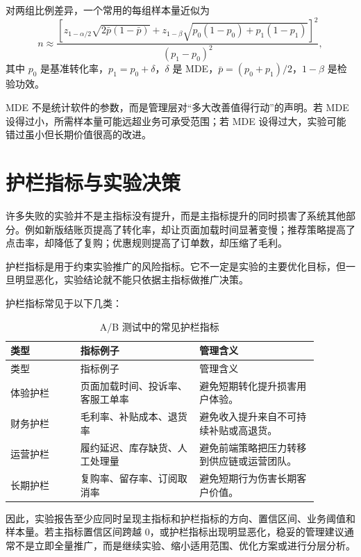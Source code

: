 \documentclass[UTF8,fontset=fandol,openany,zihao=-4]{ctexbook}
\begin{document}
对两组比例差异，一个常用的每组样本量近似为
\[
n
\approx
\frac{
\left[
z_{1-\alpha/2}\sqrt{2\bar p(1-\bar p)}
+
z_{1-\beta}\sqrt{p_0(1-p_0)+p_1(1-p_1)}
\right]^2
}{
(p_1-p_0)^2
},
\]
其中 \(p_0\) 是基准转化率，\(p_1=p_0+\delta\)，\(\delta\) 是 MDE，\(\bar p=(p_0+p_1)/2\)，\(1-\beta\) 是检验功效。

\begin{modernbox}[管理解释]
MDE 不是统计软件的参数，而是管理层对“多大改善值得行动”的声明。若 MDE 设得过小，所需样本量可能远超业务可承受范围；若 MDE 设得过大，实验可能错过虽小但长期价值很高的改进。
\end{modernbox}

\section{护栏指标与实验决策}

许多失败的实验并不是主指标没有提升，而是主指标提升的同时损害了系统其他部分。例如新版结账页提高了转化率，却让页面加载时间显著变慢；推荐策略提高了点击率，却降低了复购；优惠规则提高了订单数，却压缩了毛利。

\begin{definition}[护栏指标]
护栏指标是用于约束实验推广的风险指标。它不一定是实验的主要优化目标，但一旦明显恶化，实验结论就不能只依据主指标做推广决策。
\end{definition}

护栏指标常见于以下几类：
\begin{longtable}{>{\raggedright\arraybackslash}p{0.20\linewidth}>{\raggedright\arraybackslash}p{0.34\linewidth}>{\raggedright\arraybackslash}p{0.34\linewidth}}
\caption{A/B 测试中的常见护栏指标}\\
\toprule
类型 & 指标例子 & 管理含义\\
\midrule
\endfirsthead
\toprule
类型 & 指标例子 & 管理含义\\
\midrule
\endhead
体验护栏 & 页面加载时间、投诉率、客服工单率 & 避免短期转化提升损害用户体验。\\
财务护栏 & 毛利率、补贴成本、退货率 & 避免收入提升来自不可持续补贴或高退货。\\
运营护栏 & 履约延迟、库存缺货、人工处理量 & 避免前端策略把压力转移到供应链或运营团队。\\
长期护栏 & 复购率、留存率、订阅取消率 & 避免短期行为伤害长期客户价值。\\
\bottomrule
\end{longtable}

因此，实验报告至少应同时呈现主指标和护栏指标的方向、置信区间、业务阈值和样本量。若主指标置信区间跨越 0，或护栏指标出现明显恶化，稳妥的管理建议通常不是立即全量推广，而是继续实验、缩小适用范围、优化方案或进行分层分析。
\end{document}

